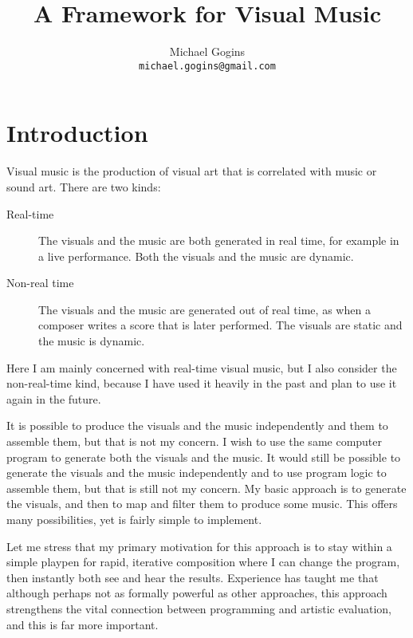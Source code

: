 \documentclass[english,11pt,letterpaper,onecolumn]{scrartcl}
\begin{document}
\title{A Framework for Visual Music}
\author{Michael Gogins \\ \texttt{michael.gogins@gmail.com}}
\maketitle



\section{Introduction}

Visual music is the production of visual art that is correlated with music 
or sound art. There are two kinds:

\begin{description}
 \item[Real-time] The visuals and the music are both generated in real time, 
for example in a live performance. Both the visuals and the music are dynamic.
 \item[Non-real time] The visuals and the music are generated out of real 
time, as when a composer writes a score that is later performed. The visuals 
are static and the music is dynamic.
\end{description}

Here I am mainly concerned with real-time visual music, but I also consider 
the non-real-time kind, because I have used it heavily in the past and plan to 
use it again in the future.

It is possible to produce the visuals and the music independently and them to 
assemble them, but that is not my concern. I wish to use the same computer 
program to generate both the visuals and the music. It 
would still be possible to generate the visuals and the music independently and 
to use program logic to assemble them, but that is still not my concern. My 
basic approach is to generate the visuals, and then to map and filter them to 
produce some music. This offers many possibilities, yet is fairly simple to 
implement.

Let me stress that my primary motivation for this approach is to stay within a 
simple playpen for rapid, iterative composition where I can change the 
program, then instantly both see and hear the results. Experience has taught 
me that although perhaps not as formally powerful as other approaches, this 
approach strengthens the vital connection between programming and artistic 
evaluation, and this is far more important.
\end{document}
